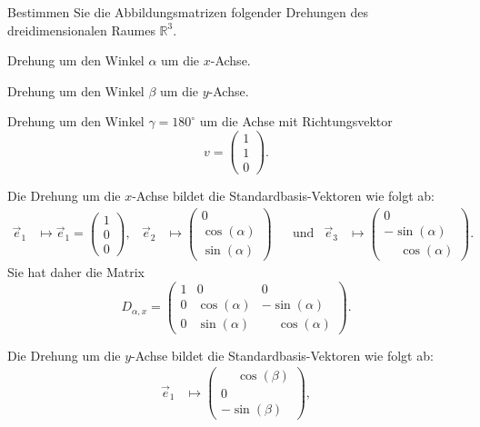 Bestimmen Sie die Abbildungsmatrizen folgender Drehungen des dreidimensionalen
Raumes $\mathbb{R}^3$.
\begin{teilaufgaben}
\item Drehung um den Winkel $\alpha$ um die $x$-Achse.
\item Drehung um den Winkel $\beta$ um die $y$-Achse.
\item Drehung um den Winkel $\gamma=180^\circ$ um die Achse mit Richtungsvektor
\[
v=\begin{pmatrix}1\\1\\0\end{pmatrix}.
\]
\end{teilaufgaben}


\begin{loesung}
\begin{teilaufgaben}
\item Die Drehung um die $x$-Achse bildet die Standardbasis-Vektoren wie folgt ab:
\[
\begin{aligned}
\vec e_1&\mapsto \vec e_1 = \begin{pmatrix}1\\0\\0\end{pmatrix},
&
\vec e_2&\mapsto \begin{pmatrix}0\\\cos(\alpha)\\\sin(\alpha)\end{pmatrix}
&&\text{und}
&
\vec e_3&\mapsto \begin{pmatrix}0\\-\sin(\alpha)\\\phantom{-}\cos(\alpha)\end{pmatrix}.
\end{aligned}
\]
Sie hat daher die Matrix
\[
D_{\alpha,x}
=
\begin{pmatrix}
1&0& 0\\
0&\cos(\alpha)& -\sin(\alpha)\\
0&\sin(\alpha)&\phantom{-}\cos(\alpha)
\end{pmatrix}.
\]
\item Die Drehung um die $y$-Achse bildet die Standardbasis-Vektoren wie folgt ab:
\[
\begin{aligned}
\vec e_1&\mapsto \begin{pmatrix}\phantom{-}\cos(\beta)\\0\\-\sin(\beta)\end{pmatrix},

\end{aligned}\]
\end{teilaufgaben}
\end{loesung}
